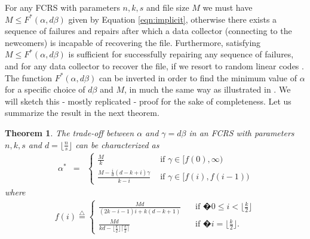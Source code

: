 \documentclass[journal,onecolumn,draftcls]{IEEEtran}
\newtheorem{theorem}{Theorem}
\begin{document}
For any FCRS with parameters $n,k,s$ and file size $M$ we must have $M\le F^*(\alpha,d\beta)$ given by Equation \eqref{eqn:implicit}, otherwise there exists a sequence of failures and repairs after which a data collector (connecting to the newcomers) is incapable of recovering the file. Furthermore, satisfying $M\le  F^*(\alpha,d\beta)$ is sufficient for successfully repairing any sequence of failures, and for any data collector to recover the file, if we resort to random linear codes \cite{ho2006random}. The function $F^*(\alpha,d\beta)$ can be inverted in order to find the minimum value of $\alpha$ for a specific choice of $d\beta$ and $M$, in much the same way as illustrated in \cite{dimakis2010network}. We will sketch this - mostly replicated - proof for the sake of completeness. Let us summarize the result in the next theorem.
\begin{theorem}
The trade-off between $\alpha$ and $\gamma = d\beta$ in an FCRS with parameters $n,k,s$ and $d = \lfloor\frac{n}{s}\rfloor$ can be characterized as
\begin{eqnarray}
\alpha^* &=& \begin{cases} \frac{{M}}{k}& \mbox{ if } \gamma \in [f(0),\infty)\\
\frac{ M - \frac{i}{d}(d- k + i)\gamma}{k-i} & \mbox{ if } \gamma \in [f(i),f(i-1))
\end{cases}
\label{eqn:optimalalpha}
\end{eqnarray}
where
\begin{eqnarray*}
f(i) \stackrel{\triangle}{=} \begin{cases}  \frac{{M}d}{(2k - i - 1)i  +k(d-k+ 1)} \; \; &\mbox{ if }�0\le i< \lfloor\frac{k}{2}\rfloor \\
 \frac{{M}d}{kd - \lfloor\frac{k}{2}\rfloor \lceil\frac{k}{2}\rceil} \; \; &\mbox{ if }�i = \lfloor\frac{k}{2}\rfloor.
\end{cases}
\end{eqnarray*}

\end{theorem}
\end{document}
